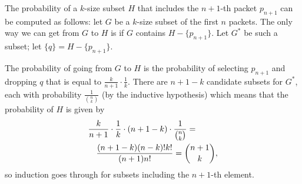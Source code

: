 The probability
of a $k$-size subset $H$ that includes the $n+1$-th packet $p_{n+1}$
can be computed as follows: let $G$ be a $k$-size
subset of  the first $n$ packets. The only way we can
get from $G$ to $H$ is if $G$ contains $H - \{p_{n+1}\}$.
Let $G^\ast$ be such a subset; let $\{q\} = H - \{p_{n+1}\}$. 

The probability of going from $G$ to $H$ is the probability
of selecting $p_{n+1}$ and dropping $q$ that is equal
to $\frac{k}{n+1}\cdot\frac{1}{k}$. There are $n+1-k$ candidate
subsets for $G^\ast$, each with probability $\frac{1}{\binom{n}{k}}$ (by the inductive hypothesis)
which means that the probability of $H$ is given by
{
\begin{eqnarray*}
\lefteqn{\frac{k}{n+1}\cdot\frac{1}{k}\cdot (n+1-k) \cdot \frac{1}{\binom{n}{k}} = } \\
 & & \frac{(n+1-k)(n-k)! k!}{(n+1)n!} = \binom{n+1}{k} ,
 \end{eqnarray*}
}
so induction goes through for subsets including the $n+1$-th element.

\begin{comment}
The algorithm is clearly correct for sequences of length $k$ or less.
To prove the algorithm is correct we use induction, starting from
sequences of length greater than or equal to $k+1$. 

For the base case, namely $n=k+1$, the probability of element $k+1$ being in
the set is $\frac{k}{k+1}$, which is clearly correct. The probability of
one of the first $k$ elements remaining in the set is $1-\frac{1}{k+1} = \frac{k}{k+1}$,
so the base case holds.

Suppose the sampling is correct for $n=l$. We now compute the probability that
an element is in the sampled set after element $l+1$ is considered.
The probability that element $l+1$ is added is exactly $\frac{k}{l+1}$, which 
is the desired probability.  The probability that element $k\leq l$ is in the
set after considering the element $l+1$ is the probability that
it was in the sampled set at iteration $l$ (which by induction is $\frac{k}{l+1}$), 
and that it was not ejected at iteration $l+1$. 
The probability of any element $i$ in the sampled
set being ejected at iteration $l+1$ is the probability of element $l+1$ being
selected times the probability that $i$ was chosen from the $k$ elements in
the sampled set to eject.
This is simply $\frac{k}{l+1}\cdot \frac{1}{k} =  \frac{1}{l+1}$.
Hence the probability of an element being present after step $l+1$ is
$\frac{k}{l}\cdot(1-\frac{1}{l+1}) = \frac{k}{l}\cdot\frac{l}{l+1}= \frac{k}{l+1}$ 
so induction goes through.
\end{comment}

